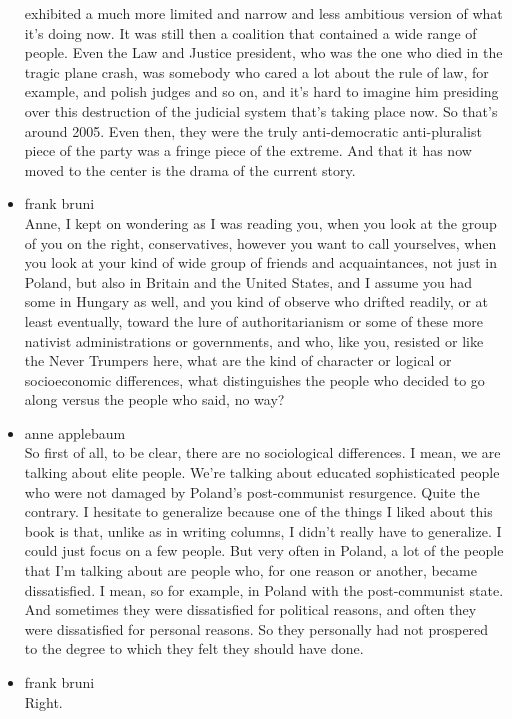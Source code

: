 \begin{itemize}
  exhibited a much more limited and narrow and less ambitious version of
  what it's doing now. It was still then a coalition that contained a
  wide range of people. Even the Law and Justice president, who was the
  one who died in the tragic plane crash, was somebody who cared a lot
  about the rule of law, for example, and polish judges and so on, and
  it's hard to imagine him presiding over this destruction of the
  judicial system that's taking place now. So that's around 2005. Even
  then, they were the truly anti-democratic anti-pluralist piece of the
  party was a fringe piece of the extreme. And that it has now moved to
  the center is the drama of the current story.
\item
  frank bruni\\
  Anne, I kept on wondering as I was reading you, when you look at the
  group of you on the right, conservatives, however you want to call
  yourselves, when you look at your kind of wide group of friends and
  acquaintances, not just in Poland, but also in Britain and the United
  States, and I assume you had some in Hungary as well, and you kind of
  observe who drifted readily, or at least eventually, toward the lure
  of authoritarianism or some of these more nativist administrations or
  governments, and who, like you, resisted or like the Never Trumpers
  here, what are the kind of character or logical or socioeconomic
  differences, what distinguishes the people who decided to go along
  versus the people who said, no way?
\item
  anne applebaum\\
  So first of all, to be clear, there are no sociological differences. I
  mean, we are talking about elite people. We're talking about educated
  sophisticated people who were not damaged by Poland's post-communist
  resurgence. Quite the contrary. I hesitate to generalize because one
  of the things I liked about this book is that, unlike as in writing
  columns, I didn't really have to generalize. I could just focus on a
  few people. But very often in Poland, a lot of the people that I'm
  talking about are people who, for one reason or another, became
  dissatisfied. I mean, so for example, in Poland with the
  post-communist state. And sometimes they were dissatisfied for
  political reasons, and often they were dissatisfied for personal
  reasons. So they personally had not prospered to the degree to which
  they felt they should have done.
\item
  frank bruni\\
  Right.

\end{itemize}
